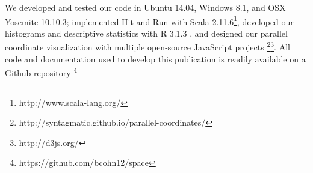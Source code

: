 We developed and tested our code in  Ubuntu 14.04, Windows 8.1, and OSX Yosemite 10.10.3; implemented Hit-and-Run with Scala 2.11.6\footnote{http://www.scala-lang.org/}, developed our histograms and descriptive statistics with R 3.1.3 \cite{rCoreCitation}, and designed our parallel coordinate visualization with multiple open-source JavaScript projects \footnote{http://syntagmatic.github.io/parallel-coordinates/}\footnote{http://d3js.org/}.
All code and documentation used to develop this publication is readily available on a Github repository \footnote{https://github.com/bcohn12/space}
